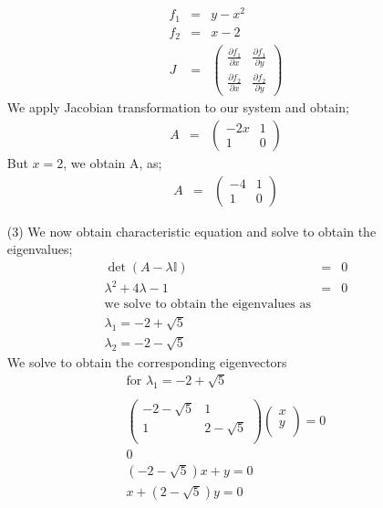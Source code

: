 \documentclass[12pt,a4paper]{article}
\begin{document}
\begin{enumerate}
\begin{eqnarray*}
f_1&=&y-x^2\\
f_2&=&x-2\\
 J&=&
\begin{pmatrix} 
\frac{\partial f_1 }{\partial x} & \frac{\partial f_1 }{\partial y} \\
\frac{\partial f_2 }{\partial x} & \frac{\partial f_2 }{\partial y}
\end{pmatrix}
\end{eqnarray*}
We apply Jacobian transformation to our system and obtain;
\begin{eqnarray*}
 A&=&
\begin{pmatrix} 
-2x & 1 \\
1 & 0
\end{pmatrix}
\end{eqnarray*}
But $x=2$, we obtain A, as;
\begin{eqnarray*}
 A&=&
\begin{pmatrix} 
-4 & 1 \\
1 & 0
\end{pmatrix}
\end{eqnarray*}
\item[(3)]
We now obtain characteristic equation and solve to obtain the eigenvalues;
\begin{eqnarray*}
\det (A-\lambda \mathbb{I})&=&0\\
\lambda ^2+4\lambda-1 &=&0\\
\text{we solve to obtain the eigenvalues as}\\
\lambda_1=-2+\sqrt{5}\\
\lambda_2=-2-\sqrt{5}
\end{eqnarray*}
We solve to obtain the corresponding eigenvectors
\begin{eqnarray*}
\text{for $\lambda_1=-2+\sqrt{5}$}\\ \\
\begin{pmatrix} 
-2-\sqrt{5} & 1 \\
1 & 2-\sqrt{5}\\
\end{pmatrix}
\begin{pmatrix} 
 x \\
y\\
\end{pmatrix}=
 0 \\
0\\
(-2-\sqrt{5})x +y=0\\
x+(2-\sqrt{5})y =0\\ \\

\end{eqnarray*}
\end{enumerate}
\end{document}
